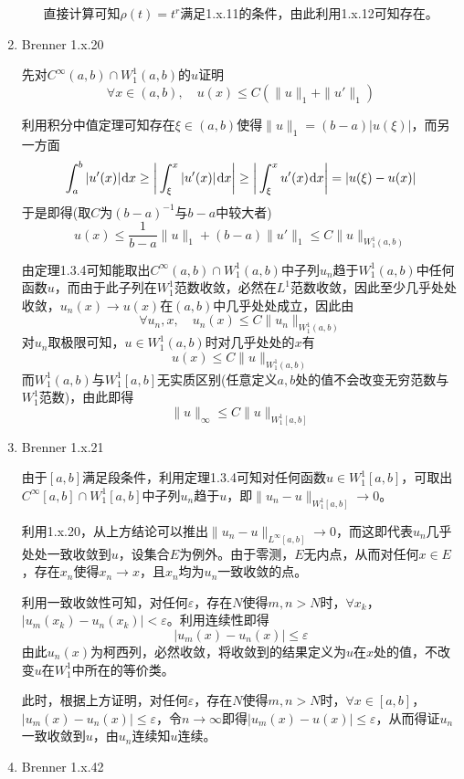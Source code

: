 \documentclass[a4paper,UTF8,fontset=windows,10pt]{ctexart}
\newcommand*{\dr}{\hspace{0.07em}\mathrm{d}}
\begin{document}
\begin{enumerate}
\begin{itemize}
        直接计算可知$\rho(t)=t^r$满足1.x.11的条件，由此利用1.x.12可知存在。
    \end{itemize}
    
    \item Brenner 1.x.20
    
    先对$C^\infty(a,b)\cap W_1^1(a,b)$的$u$证明
    $$\forall x\in(a,b),\quad u(x)\le C(\|u\|_1+\|u'\|_1)$$
    
    利用积分中值定理可知存在$\xi\in(a,b)$使得$\|u\|_1=(b-a)|u(\xi)|$，而另一方面
    $$\int_a^b|u'(x)|\dr x\ge\bigg|\int_\xi^x|u'(x)|\dr x\bigg|\ge\bigg|\int_\xi^xu'(x)\dr x\bigg|=|u(\xi)-u(x)|$$
    于是即得(取$C$为$(b-a)^{-1}$与$b-a$中较大者)
    $$u(x)\le\frac{1}{b-a}\|u\|_1+(b-a)\|u'\|_1\le C\|u\|_{W_1^1(a,b)}$$
    
    由定理1.3.4可知能取出$C^\infty(a,b)\cap W_1^1(a,b)$中子列$u_n$趋于$W_1^1(a,b)$中任何函数$u$，而由于此子列在$W_1^1$范数收敛，必然在$L^1$范数收敛，因此至少几乎处处收敛，$u_n(x)\to u(x)$在$(a,b)$中几乎处处成立，因此由
    $$\forall u_n,x,\quad u_n(x)\le C\|u_n\|_{W_1^1(a,b)}$$
    对$u_n$取极限可知，$u\in W_1^1(a,b)$时对几乎处处的$x$有
    $$u(x)\le C\|u\|_{W_1^1(a,b)}$$
    而$W_1^1(a,b)$与$W_1^1[a,b]$无实质区别(任意定义$a,b$处的值不会改变无穷范数与$W_1^1$范数)，由此即得
    $$\|u\|_\infty\le C\|u\|_{W_1^1[a,b]}$$
    
    \item Brenner 1.x.21
    
    由于$[a,b]$满足段条件，利用定理1.3.4可知对任何函数$u\in W_1^1[a,b]$，可取出$C^\infty[a,b]\cap W_1^1[a,b]$中子列$u_n$趋于$u$，即$\|u_n-u\|_{W_1^1[a,b]}\to0$。
    
    利用1.x.20，从上方结论可以推出$\|u_n-u\|_{L^\infty[a,b]}\to0$，而这即代表$u_n$几乎处处一致收敛到$u$，设集合$E$为例外。由于零测，$E$无内点，从而对任何$x\in E$，存在$x_n$使得$x_n\to x$，且$x_n$均为$u_n$一致收敛的点。
    
    利用一致收敛性可知，对任何$\varepsilon$，存在$N$使得$m,n>N$时，$\forall x_k$，$|u_m(x_k)-u_n(x_k)|<\varepsilon$。利用连续性即得
    $$|u_m(x)-u_n(x)|\le\varepsilon$$
    由此$u_n(x)$为柯西列，必然收敛，将收敛到的结果定义为$u$在$x$处的值，不改变$u$在$W_1^1$中所在的等价类。
    
    此时，根据上方证明，对任何$\varepsilon$，存在$N$使得$m,n>N$时，$\forall x\in[a,b]$，$|u_m(x)-u_n(x)|\le\varepsilon$，令$n\to\infty$即得$|u_m(x)-u(x)|\le\varepsilon$，从而得证$u_n$一致收敛到$u$，由$u_n$连续知$u$连续。
    
    \item Brenner 1.x.42
    

\end{enumerate}
\end{document}
